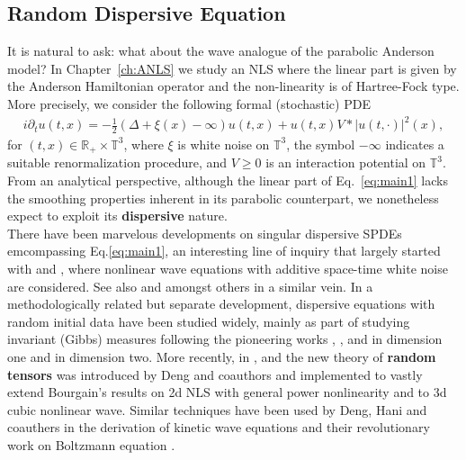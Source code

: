 \subsection{Random Dispersive Equation}\label{sec:intro-ANLS}

It is natural to ask: what about the wave analogue of the parabolic Anderson model? In Chapter~\ref{ch:ANLS} we study an NLS where
the linear part is given by the Anderson Hamiltonian operator and the
non-linearity is of Hartree-Fock type. More precisely, we consider
the following formal (stochastic) PDE
\begin{align}\label{eq:main1}
  i \partial_t u (t, x) = - \frac{1}{2} (\Delta + \xi (x) - \infty) u (t, x) +
  u (t, x) V \ast | u (t, \cdot) |^2 (x), 
\end{align}
for $(t, x) \in \mathbb{R}_+
  \times \mathbb{T}^3$, where $\xi$ is white noise on $\mathbb{T}^3$, the symbol $- \infty$
indicates a suitable renormalization procedure, and $V \geqslant 0$
is an interaction potential on $\mathbb{T}^3$. From an analytical perspective, although the linear part of Eq.~\eqref{eq:main1} lacks the smoothing properties inherent in its parabolic counterpart, we nonetheless expect to exploit its \textbf{dispersive} nature.  \\

There have been marvelous developments on singular dispersive SPDEs emcompassing Eq.\eqref{eq:main1}, an interesting line of inquiry that largely started with {\cite{GKO23}} and {\cite{GKOT22}}, where nonlinear wave equations with additive space-time white noise are considered. See also {\cite{OOR20}} and {\cite{ORSW21}} amongst others in a similar vein. In a methodologically related but separate development, dispersive equations with random initial data have been studied widely, mainly as part of studying invariant (Gibbs) measures following the pioneering works {\cite{F85}}, {\cite{Z91}}, {\cite{LRS88}} and {\cite{B94}} in dimension one and {\cite{Bourgain1996}} in dimension two. More recently, in {\cite{DNY24}}, {\cite{DNY22}} and {\cite{BDNY24}} the new theory of \textbf{random tensors} was introduced by Deng and coauthors and implemented to vastly extend Bourgain's results on 2d NLS with general power nonlinearity and to 3d
cubic nonlinear wave. Similar techniques have been used by Deng, Hani and coauthers in the derivation of kinetic wave equations \cite{DengHani2020} and their revolutionary work on Boltzmann equation \cite{DengHaniMa2024,DengHaniMa2025}.\\

